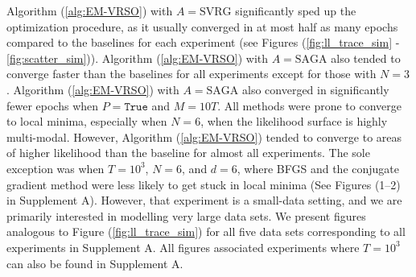 Algorithm (\ref{alg:EM-VRSO}) with $A=\text{SVRG}$ significantly sped up the optimization procedure, as it usually converged in at most half as many epochs compared to the baselines for each experiment (see Figures (\ref{fig:ll_trace_sim} - \ref{fig:scatter_sim})). Algorithm (\ref{alg:EM-VRSO}) with $A=\text{SAGA}$ also tended to converge faster than the baselines for all experiments except for those with $N=3$. Algorithm (\ref{alg:EM-VRSO}) with $A=\text{SAGA}$ also converged in significantly fewer epochs when $P = \texttt{True}$ and $M=10T$. 
%
All methods were prone to converge to local minima, especially when $N=6$, when the likelihood surface is highly multi-modal. However, Algorithm (\ref{alg:EM-VRSO}) tended to converge to areas of higher likelihood than the baseline for almost all experiments. The sole exception was when $T=10^3$, $N=6$, and $d=6$, where BFGS and the conjugate gradient method were less likely to get stuck in local minima (See Figures (1--2) in Supplement A). However, that experiment is a small-data setting, and we are primarily interested in modelling very large data sets. %
%
%
We present figures analogous to Figure (\ref{fig:ll_trace_sim}) for all five data sets corresponding to all experiments in Supplement A. All figures associated experiments where $T=10^3$ can also be found in Supplement A. 

%



